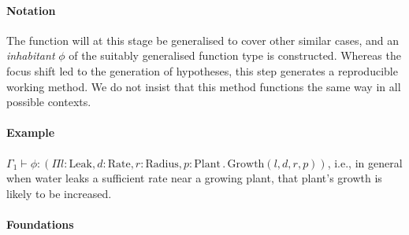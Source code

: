  \paragraph{\textbf{\upshape Notation}}
 The function will at this stage be generalised to cover other similar
 cases, and an \emph{inhabitant} $\phi$ of the suitably generalised
 function type is constructed.  Whereas the focus shift led to the
 generation of hypotheses, this step generates a reproducible working
 method.  We do not insist that this method functions the same way in
 all possible contexts.

 \paragraph{\textbf{\upshape Example}}
 $\Gamma_1 \vdash \phi : (\Pi l:\mathrm{Leak}, d:\mathrm{Rate},
 r:\mathrm{Radius}, p:\mathrm{Plant} \mathbin{.}
 \mathrm{Growth}(l,d,r,p))$, i.e., in general when water leaks a
 sufficient rate near a growing plant, that plant's growth is likely to
 be increased.

 \begin{center}
 \asterism
 \end{center}

 \paragraph{\textbf{\upshape Foundations}}
                                         
